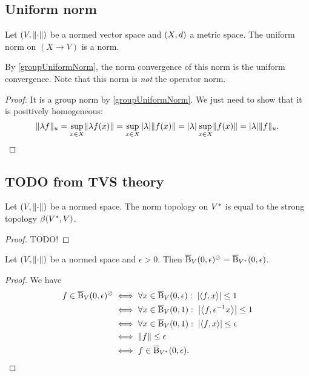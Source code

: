 \subsection{Uniform norm}
\begin{lemma} \label{vectorSpaceUniformNorm}
Let $\sSet{V,\norm{\cdot}}$ be a normed vector space and $\sSet{X,d}$ a metric space. The uniform norm on $(X\to V)$ is a norm.
\end{lemma}
By \ref{groupUniformNorm}, the norm convergence of this norm is the uniform convergence. Note that this norm is \emph{not} the operator norm.
\begin{proof}
It is a group norm by \ref{groupUniformNorm}. We just need to show that it is positively homogeneous:
\[ \lVert\lambda f\rVert_u = \sup_{x\in X}\lVert\lambda f(x)\rVert = \sup_{x\in X}|\lambda|\lVert f(x)\rVert = |\lambda|\sup_{x\in X}\lVert f(x)\rVert = |\lambda|\lVert f\rVert_u. \]
\end{proof}

\subsection{TODO from TVS theory}
\begin{proposition} \label{dualNormTopologyStrong}
Let $\sSet{V, \norm{\cdot}}$ be a normed space. The norm topology on ${V}^*$ is equal to the strong topology $\beta({V}^*, V)$.
\end{proposition}
\begin{proof}
TODO!
\end{proof}

\begin{lemma} \label{polarOfBall}
Let $\sSet{V, \norm{\cdot}}$ be a normed space and $\epsilon >0$. Then $\operatorname{\overline{B}}_V(0,\epsilon)^\oslash = \operatorname{\overline{B}}_{{V}^*}(0,\epsilon)$.
\end{lemma}
\begin{proof}
We have
\begin{align*}
f\in \operatorname{\overline{B}}_V(0,\epsilon)^\oslash &\iff \forall x\in \operatorname{\overline{B}}_V(0,\epsilon): \; \left|\left\langle f,x \right\rangle\right| \leq 1 \\
&\iff \forall x\in \operatorname{\overline{B}}_V(0,1): \; \left|\left\langle f,\epsilon^{-1}x \right\rangle\right| \leq 1 \\
&\iff \forall x\in \operatorname{\overline{B}}_V(0,1): \; \left|\left\langle f,x \right\rangle\right| \leq \epsilon \\
&\iff \lVert f\rVert \leq \epsilon \\
&\iff f\in \operatorname{\overline{B}}_{{V}^*}(0,\epsilon).
\end{align*}
\end{proof}

